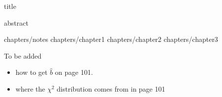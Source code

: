 \documentclass[12pt]{book}
\begin{document}
\frontmatter



{title}

{abstract}
\tableofcontents


\restoregeometry

\mainmatter


\setcounter{chapter}{-1} %
{chapters/notes}
{chapters/chapter1}
{chapters/chapter2}
{chapters/chapter3}

\newpage

To be added
\begin{itemize}
    \item how to get $\hat b$ on page 101.
    \item where the $\chi^2$ distribution comes from in page 101
\end{itemize}
	

\backmatter
\end{document}
